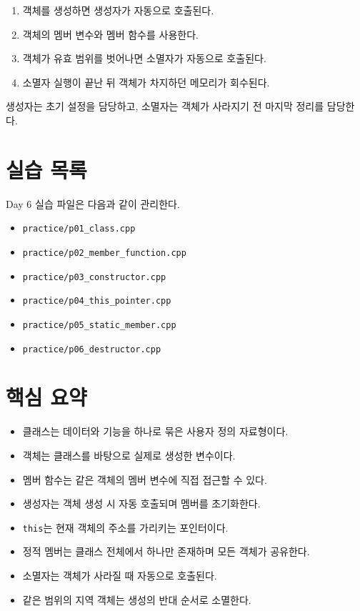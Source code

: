 \documentclass[11pt,a4paper]{article}
\begin{document}
\begin{enumerate}[leftmargin=2em]
    \item 객체를 생성하면 생성자가 자동으로 호출된다.
    \item 객체의 멤버 변수와 멤버 함수를 사용한다.
    \item 객체가 유효 범위를 벗어나면 소멸자가 자동으로 호출된다.
    \item 소멸자 실행이 끝난 뒤 객체가 차지하던 메모리가 회수된다.
\end{enumerate}

생성자는 초기 설정을 담당하고, 소멸자는 객체가 사라지기 전 마지막 정리를 담당한다.


\section{실습 목록}
\begin{practicebox}
Day 6 실습 파일은 다음과 같이 관리한다.
\begin{itemize}[leftmargin=1.5em]
    \item \texttt{practice/p01\_class.cpp}
    \item \texttt{practice/p02\_member\_function.cpp}
    \item \texttt{practice/p03\_constructor.cpp}
    \item \texttt{practice/p04\_this\_pointer.cpp}
    \item \texttt{practice/p05\_static\_member.cpp}
    \item \texttt{practice/p06\_destructor.cpp}
\end{itemize}
\end{practicebox}


\section{핵심 요약}
\begin{importantbox}
\begin{itemize}[leftmargin=1.5em]
    \item 클래스는 데이터와 기능을 하나로 묶은 사용자 정의 자료형이다.
    \item 객체는 클래스를 바탕으로 실제로 생성한 변수이다.
    \item 멤버 함수는 같은 객체의 멤버 변수에 직접 접근할 수 있다.
    \item 생성자는 객체 생성 시 자동 호출되며 멤버를 초기화한다.
    \item \texttt{this}는 현재 객체의 주소를 가리키는 포인터이다.
    \item 정적 멤버는 클래스 전체에서 하나만 존재하며 모든 객체가 공유한다.
    \item 소멸자는 객체가 사라질 때 자동으로 호출된다.
    \item 같은 범위의 지역 객체는 생성의 반대 순서로 소멸한다.
\end{itemize}
\end{importantbox}
\end{document}
